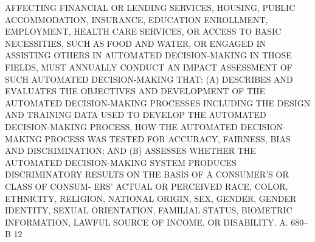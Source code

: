  AFFECTING FINANCIAL OR LENDING SERVICES, HOUSING, PUBLIC  ACCOMMODATION,
 INSURANCE,  EDUCATION  ENROLLMENT,  EMPLOYMENT, HEALTH CARE SERVICES, OR
 ACCESS TO BASIC NECESSITIES, SUCH AS  FOOD  AND  WATER,  OR  ENGAGED  IN
 ASSISTING  OTHERS  IN  AUTOMATED  DECISION-MAKING  IN THOSE FIELDS, MUST
 ANNUALLY CONDUCT AN IMPACT ASSESSMENT OF SUCH AUTOMATED  DECISION-MAKING
 THAT:
   (A)  DESCRIBES  AND  EVALUATES  THE  OBJECTIVES AND DEVELOPMENT OF THE
 AUTOMATED DECISION-MAKING PROCESSES INCLUDING THE  DESIGN  AND  TRAINING
 DATA  USED  TO  DEVELOP  THE  AUTOMATED DECISION-MAKING PROCESS, HOW THE
 AUTOMATED DECISION-MAKING PROCESS WAS  TESTED  FOR  ACCURACY,  FAIRNESS,
 BIAS AND DISCRIMINATION; AND
   (B)  ASSESSES  WHETHER  THE  AUTOMATED DECISION-MAKING SYSTEM PRODUCES
 DISCRIMINATORY RESULTS ON THE BASIS OF A CONSUMER'S OR CLASS OF  CONSUM-
 ERS'  ACTUAL  OR  PERCEIVED  RACE,  COLOR, ETHNICITY, RELIGION, NATIONAL
 ORIGIN, SEX,  GENDER,  GENDER  IDENTITY,  SEXUAL  ORIENTATION,  FAMILIAL
 STATUS, BIOMETRIC INFORMATION, LAWFUL SOURCE OF INCOME, OR DISABILITY.
 A. 680--B                          12
 

